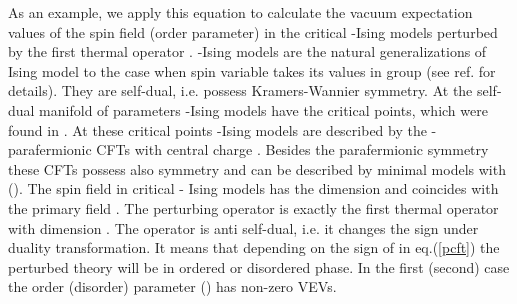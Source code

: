 \documentclass[a4paper,12pt]{article}
\begin{document}
As an example, we apply this equation to 
calculate the vacuum expectation values of
the spin field (order parameter) \myHighlight{$\sigma $}\coordHE{} in the critical \coordHE{}-Ising models 
perturbed by the first thermal operator 
\myHighlight{$\varepsilon$}\coordHE{}. \coordHE{}-Ising models are the natural generalizations of Ising model to the case when spin variable takes its values 
in group \coordHE{} (see ref. \cite{VFAZ} for details). They are 
self-dual, i.e. possess Kramers-Wannier symmetry. At the self-dual manifold of
parameters \coordHE{}-Ising models have the critical points, which were found in
\cite{VFAZ}. At these critical points   
\coordHE{}-Ising models are described by the 
\coordHE{}-parafermionic CFTs with central charge 
\coordHE{}.
Besides the parafermionic symmetry these CFTs possess also \coordHE{}
symmetry and can be described by \coordHE{} minimal models
with \coordHE{} (\coordHE{}). The spin field \myHighlight{$\sigma $}\coordHE{}
in critical \coordHE{}- Ising models has the dimension 
\coordHE{} and coincides with the primary field 
\coordHE{}. 
The perturbing operator \coordHE{} is exactly the
first thermal operator \myHighlight{$\varepsilon $}\coordHE{} with dimension 
\coordHE{}. The operator \myHighlight{$\varepsilon $}\coordHE{} is anti self-dual, i.e. it changes the sign under duality transformation. It means that depending 
on the sign of \myHighlight{$\lambda$}\coordHE{} in eq.(\ref{pcft}) the perturbed theory will be in 
ordered or disordered phase. In the first (second) case the order (disorder) 
parameter \myHighlight{$\sigma$}\coordHE{} (\myHighlight{$\mu$}\coordHE{}) has non-zero VEVs.
\end{document}

